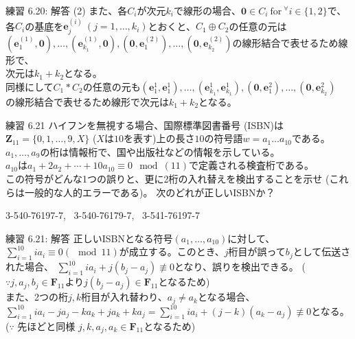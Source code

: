 \documentclass[dvipdfmx,10pt,jsarticle]{beamer}
\begin{document}
  \begin{frame}{練習 6.20: 解答 (2)}
    また、各$C_i$が次元$k_i$で線形の場合、$\mathbf{0} \in C_i \ \text{for} \ {}^\forall i \in \lbrace 1, 2 \rbrace$で、\\
    各$C_i$の基底を$\mathbf{e}_j^{(i)} \ (j = 1 , \ldots, k_i)$とおくと、$C_1 \oplus C_2$の任意の元は \\
    $(\mathbf{e}_1^{(1)},\mathbf{0}) , \ldots, (\mathbf{e}_{k_1}^{(1)}, \mathbf{0}), (\mathbf{0}, \mathbf{e}_1^{(2)}), \ldots, (\mathbf{0}, \mathbf{e}_{k_2}^{(2)})$の線形結合で表せるため線形で、 \\
    次元は$k_1 + k_2$となる。\\
    同様にして$C_1 \ast C_2$の任意の元も$(\mathbf{e}_1^1,\mathbf{e}_1^1) , \ldots, (\mathbf{e}_{k_1}^1, \mathbf{e}_{k_1}^1), (\mathbf{0}, \mathbf{e}_1^2), \ldots, (\mathbf{0}, \mathbf{e}_{k_2}^2)$ \\
    の線形結合で表せるため線形で次元は$k_1 + k_2$となる。
    
  \end{frame}

  \begin{frame}{練習 6.21}
    ハイフンを無視する場合、国際標準図書番号 (ISBN)は$\mathbf{Z}_{11} = \lbrace 0, 1, \ldots, 9, X\rbrace$ ($X$は$10$を表す)上の長さ$10$の符号語$w = a_1 \ldots a_{10}$である。\\
    $a_1, \ldots, a_9$の桁は情報桁で、国や出版社などの情報を示している。 \\ $a_{10}$は$a_1 + 2a_2 + \cdots + 10 a_{10} \equiv 0 \mod (11)$で定義される検査桁である。 \\
    この符号がどんな1つの誤りと、更に2桁の入れ替えを検出することを示せ (これらは一般的な人的エラーである)。 次のどれが正しいISBNか？ \\
    \begin{center}
        3-540-76197-7, \ 3-540-76179-7, \ 3-541-76197-7 
    \end{center}
  \end{frame}
  
  \begin{frame}{練習 6.21: 解答}
    正しいISBNとなる符号$(a_1, \ldots, a_{10})$に対して、$\sum_{i=1}^{10} i a_i \equiv 0 (\mod 11)$が成立する。このとき、$j$桁目が誤って$b_j$として伝送された場合、
    $\sum_{i=1}^{10} i a_i + j(b_j - a_j) \not\equiv 0$となり、誤りを検出できる。 ($\because j, a_j, b_j \in \mathbf{F}_{11}$より$j(b_j - a_j) \in \mathbf{F}_{11}$となるため) \\
    また、2つの桁$j,k$桁目が入れ替わり、$a_j \neq a_k$となる場合、$\sum_{i=1}^{10} i a_i - j a_j - k a_k + j a_k + k a_j = \sum_{i=1}^{10} ia_i + (j - k) (a_k - a_j) \not\equiv 0$となる。\\
    ($\because$ 先ほどと同様 $j, k , a_j, a_k \in \mathbf{F}_{11}$となるため)
    
  \end{frame}
\end{document}
